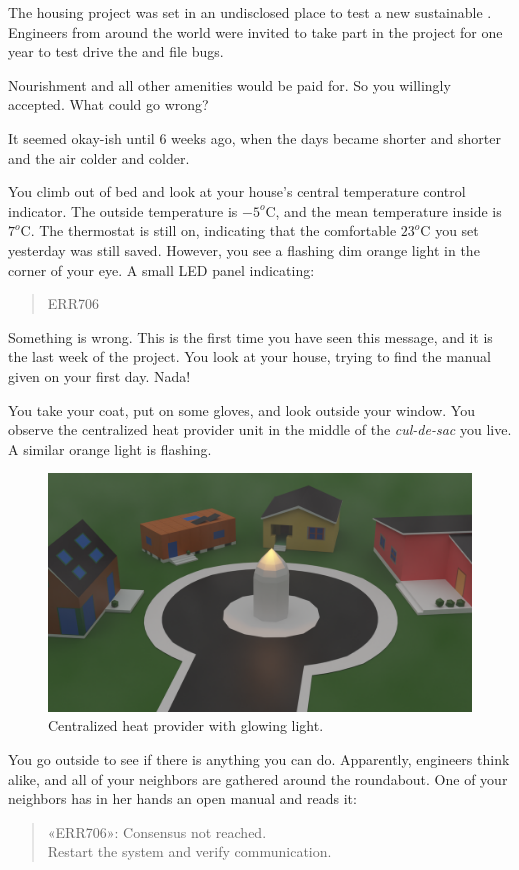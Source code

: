 \documentclass[../main.tex]{subfiles}
\begin{document}
The housing project was set in an undisclosed place to test a new sustainable \dhn{}.
Engineers from around the world were invited to take part in the project for one year to test drive the \dhn{} and file bugs.

Nourishment and all other amenities would be paid for.
So you willingly accepted.
What could go wrong?

It seemed okay-ish until $6$ weeks ago, when the days became shorter and shorter and the air colder and colder.

You climb out of bed and look at your house's central temperature control indicator. The outside temperature is $-5^{o}$C, and the mean temperature inside is $7^{o}$C.
The thermostat is still on, indicating that the comfortable $23^{o}$C you set yesterday was still saved. However, you see a flashing dim orange light in the corner of your eye. A small LED panel indicating:
\begin{quote}
ERR706
\end{quote}

Something is wrong.
This is the first time you have seen this message, and it is the last week of the project.
You look at your house, trying to find the manual given on your first day. Nada!

You take your coat, put on some gloves, and look outside your window.
You observe the centralized heat provider unit in the middle of the \emph{cul-de-sac} you live.
A similar orange light is flashing.
\begin{figure}[H]
  \centering
  \includegraphics[width=.75\textwidth]{../img/district_3d_cycles_lights2.png}
  \caption{Centralized heat provider with glowing light.}\label{fig:culdesac}
\end{figure}

You go outside to see if there is anything you can do.
Apparently, engineers think alike, and all of your neighbors are gathered around the roundabout.
One of your neighbors has in her hands an open manual and reads it:
\begin{quote}
  «ERR706»: Consensus not reached.\\
  Restart the system and verify communication.
\end{quote}
\end{document}
